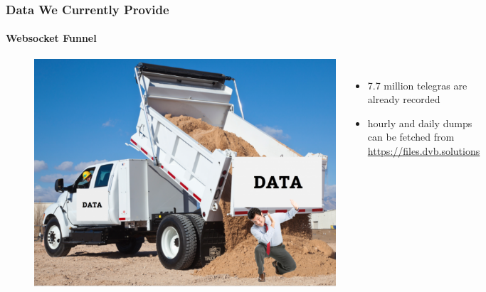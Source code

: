 
\begin{frame}[fragile]
\frametitle{Data We Currently Provide}
\framesubtitle{Websocket Funnel}
\begin{figure}
\begin{columns}
  \includegraphics[height=0.65\textheight]{figs/data_dump.png}
\raggedright
\vspace{0.5cm}

\begin{itemize}
  \item 7.7 million telegras are already recorded
  \item hourly and daily dumps can be fetched from \url{https://files.dvb.solutions}
\end{itemize}
\end{columns}
\end{figure}
\end{frame}

